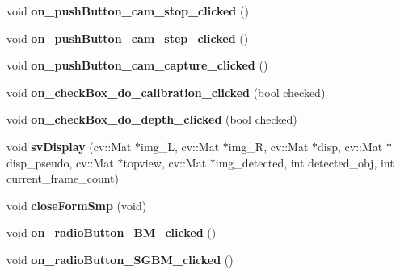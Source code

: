 \begin{DoxyCompactItemize}
\item 
\hypertarget{class_main_window_a9dba31f02f55c580aa005163c0ad55bb}{}void {\bfseries on\+\_\+push\+Button\+\_\+cam\+\_\+stop\+\_\+clicked} ()\label{class_main_window_a9dba31f02f55c580aa005163c0ad55bb}

\item 
\hypertarget{class_main_window_a2c809869d0bfe5017feb9d3af9d04032}{}void {\bfseries on\+\_\+push\+Button\+\_\+cam\+\_\+step\+\_\+clicked} ()\label{class_main_window_a2c809869d0bfe5017feb9d3af9d04032}

\item 
\hypertarget{class_main_window_a38e6a6d2b814e8547a575729ef91bba1}{}void {\bfseries on\+\_\+push\+Button\+\_\+cam\+\_\+capture\+\_\+clicked} ()\label{class_main_window_a38e6a6d2b814e8547a575729ef91bba1}

\item 
\hypertarget{class_main_window_a64cc3067de847cd79997c8d5bc2f147c}{}void {\bfseries on\+\_\+check\+Box\+\_\+do\+\_\+calibration\+\_\+clicked} (bool checked)\label{class_main_window_a64cc3067de847cd79997c8d5bc2f147c}

\item 
\hypertarget{class_main_window_aa447259fa7c91de734ced19ae24368bc}{}void {\bfseries on\+\_\+check\+Box\+\_\+do\+\_\+depth\+\_\+clicked} (bool checked)\label{class_main_window_aa447259fa7c91de734ced19ae24368bc}

\item 
\hypertarget{class_main_window_ae9bae4b6ce15716892551a698d751128}{}void {\bfseries sv\+Display} (cv\+::\+Mat $\ast$img\+\_\+\+L, cv\+::\+Mat $\ast$img\+\_\+\+R, cv\+::\+Mat $\ast$disp, cv\+::\+Mat $\ast$disp\+\_\+pseudo, cv\+::\+Mat $\ast$topview, cv\+::\+Mat $\ast$img\+\_\+detected, int detected\+\_\+obj, int current\+\_\+frame\+\_\+count)\label{class_main_window_ae9bae4b6ce15716892551a698d751128}

\item 
\hypertarget{class_main_window_a355975f6b124c66571ce71019ed8340c}{}void {\bfseries close\+Form\+Smp} (void)\label{class_main_window_a355975f6b124c66571ce71019ed8340c}

\item 
\hypertarget{class_main_window_a4e8c0c6d5d5cefa708138fdadfcffc5a}{}void {\bfseries on\+\_\+radio\+Button\+\_\+\+B\+M\+\_\+clicked} ()\label{class_main_window_a4e8c0c6d5d5cefa708138fdadfcffc5a}

\item 
\hypertarget{class_main_window_aca90b3e646f2f2175972b86b7f447729}{}void {\bfseries on\+\_\+radio\+Button\+\_\+\+S\+G\+B\+M\+\_\+clicked} ()\label{class_main_window_aca90b3e646f2f2175972b86b7f447729}


\end{DoxyCompactItemize}
